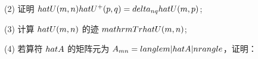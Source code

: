 (2) 证明 $\\hat{U}(m,n)\\hat{U}^+(p,q) = \\delta_{nq} \\hat{U}(m,p)$;

(3) 计算 $\\hat{U}(m,n)$ 的迹 $\\mathrm{Tr}\\{\\hat{U}(m,n)\\}$;

(4) 若算符 $\\hat{A}$ 的矩阵元为 $A_{mn} = \\langle m|\\hat{A}|n\\rangle$，证明：

\\[1. \\hat{A} = \\sum_{mn} A_{mn} \\hat{U}(m,n)\\]

\\[2. A_{pq} = \\mathrm{Tr}\\left\\{\\hat{U}^+(p,q)\\hat{A}\\right\\}\\]
